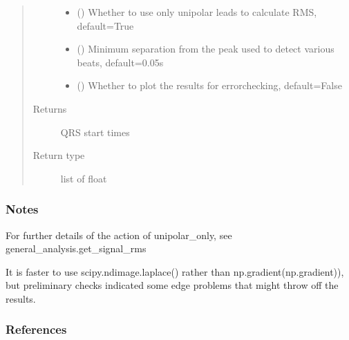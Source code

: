 \documentclass[letterpaper,10pt,english]{sphinxmanual}
\begin{document}
\begin{fulllineitems}
\begin{fulllineitems}
\begin{quote}
\begin{description}
\begin{itemize}
\item {} 
\sphinxAtStartPar
{} (\sphinxstyleliteralemphasis{\sphinxupquote{, }}) \textendash{} Whether to use only unipolar leads to calculate RMS, default=True

\item {} 
\sphinxAtStartPar
{} (\sphinxstyleliteralemphasis{\sphinxupquote{, }}) \textendash{} Minimum separation from the peak used to detect various beats, default=0.05s

\item {} 
\sphinxAtStartPar
{} (\sphinxstyleliteralemphasis{\sphinxupquote{, }}) \textendash{} Whether to plot the results for error\sphinxhyphen{}checking, default=False

\end{itemize}

\item[{Returns}] \leavevmode
\sphinxAtStartPar
{} \textendash{} QRS start times

\item[{Return type}] \leavevmode
\sphinxAtStartPar
list of float

\end{description}\end{quote}
\subsubsection*{Notes}

\sphinxAtStartPar
For further details of the action of unipolar\_only, see general\_analysis.get\_signal\_rms

\sphinxAtStartPar
It is faster to use scipy.ndimage.laplace() rather than np.gradient(np.gradient)), but preliminary checks
indicated some edge problems that might throw off the results.
\subsubsection*{References}

\end{fulllineitems}


\end{fulllineitems}
\end{document}
